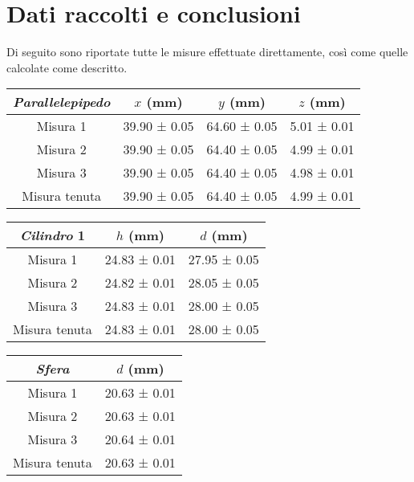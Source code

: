 \documentclass{article}
\begin{document}
\section{Dati raccolti e conclusioni}
Di seguito sono riportate tutte le misure effettuate direttamente, così come quelle calcolate come descritto.

\begin{center}
    \begin{tabular}{ |c|c|c|c| }
        \hline
        \emph{Parallelepipedo} & $x$ (mm) & $y$ (mm) & $z$ (mm) \\
        \hline
        Misura 1 & 39.90 ± 0.05 & 64.60 ± 0.05 & 5.01 ± 0.01 \\
        Misura 2 & 39.90 ± 0.05 & 64.40 ± 0.05 & 4.99 ± 0.01 \\
        Misura 3 & 39.90 ± 0.05 & 64.40 ± 0.05 & 4.98 ± 0.01 \\
        \hline
        Misura tenuta & 39.90 ± 0.05 & 64.40 ± 0.05 & 4.99 ± 0.01 \\
        \hline
    \end{tabular}
    \newline
    \vspace*{0.4 cm}
    \newline
    \begin{tabular}{ |c|c|c| }
        \hline
        \emph{Cilindro} 1 & $h$ (mm) & $d$ (mm) \\
        \hline
        Misura 1 & 24.83 ± 0.01 & 27.95 ± 0.05 \\
        Misura 2 & 24.82 ± 0.01 & 28.05 ± 0.05 \\
        Misura 3 & 24.83 ± 0.01 & 28.00 ± 0.05 \\
        \hline
        Misura tenuta & 24.83 ± 0.01 & 28.00 ± 0.05 \\
        \hline
    \end{tabular}
    \newline
    \vspace*{0.4 cm}
    \newline
    \begin{tabular}{ |c|c| }
        \hline
        \emph{Sfera} & $d$ (mm) \\
        \hline
        Misura 1 & 20.63 ± 0.01 \\
        Misura 2 & 20.63 ± 0.01 \\
        Misura 3 & 20.64 ± 0.01 \\
        \hline
        Misura tenuta & 20.63 ± 0.01 \\
        \hline

\end{tabular}
\end{center}
\end{document}
